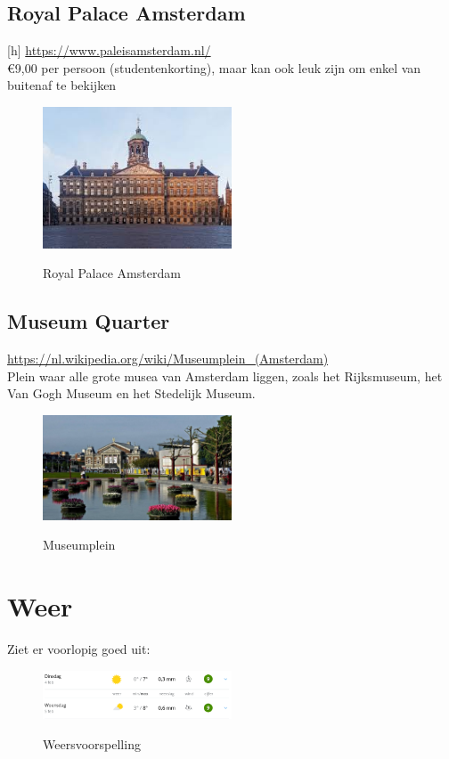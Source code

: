 \documentclass[a4paper, 12pt]{article}
\begin{document}
\subsection{Royal Palace Amsterdam}[h]
\url{https://www.paleisamsterdam.nl/}\\
€9,00 per persoon (studentenkorting), maar kan ook leuk zijn om enkel van buitenaf te bekijken\\

\begin{figure}[h]
    \centering
    \includegraphics[width=0.5\textwidth]{koninklijk_paleis.jpg}\label{fig:koninklijk_paleis}
    \caption{Royal Palace Amsterdam}
\end{figure}

\subsection{Museum Quarter}
\url{https://nl.wikipedia.org/wiki/Museumplein_(Amsterdam)}\\
Plein waar alle grote musea van Amsterdam liggen, zoals het Rijksmuseum, het Van Gogh Museum en het Stedelijk Museum.

\begin{figure}[h]
    \centering
    \includegraphics[width=0.5\textwidth]{museumplein.jpg}\label{fig:museumplein}
    \caption{Museumplein}
\end{figure}

\section{Weer}
Ziet er voorlopig goed uit:
\begin{figure}[h]
    \centering
    \includegraphics[width=0.5\textwidth]{weerbericht.png}\label{fig:weer}
    \caption{Weersvoorspelling}
\end{figure}
\end{document}
